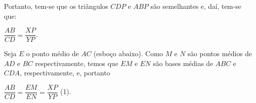 \documentclass{hipatia}
\begin{document}
\vspace*{0.2cm}

Portanto, tem-se que os triângulos $CDP$ e $ABP$ são semelhantes e, daí, tem-se que:

\vspace*{0.2cm}

\begin{center}
$\dfrac{AB}{CD}=\dfrac{XP}{YP}$.
\end{center}

\vspace{0.2cm}

Seja $E$ o ponto médio de $AC$ (esboço abaixo). Como $M$ e $N$ são pontos médios de $AD$ e $BC$ respectivamente, temos que $EM$ e $EN$ são bases médias de $ABC$ e $CDA$, respectivamente, e, portanto

\vspace*{0.2cm}

\begin{center}
$\dfrac{AB}{CD}=\dfrac{EM}{EN}=\dfrac{XP}{YP}$ (1). 
\end{center}
\end{document}
